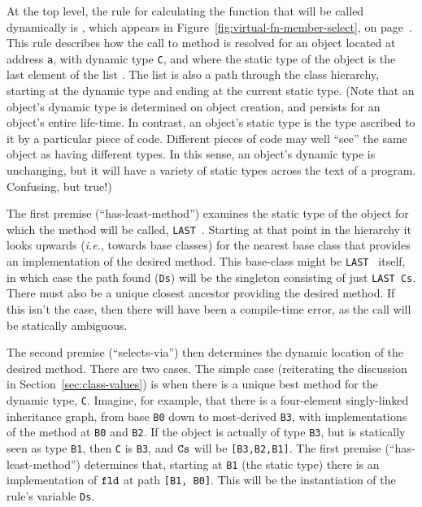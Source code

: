 \documentclass[11pt]{article}
\newcommand{\ie}{\emph{i.e.}}
\begin{document}
At the top level, the rule for calculating the function that will be
called dynamically is , which appears
in Figure~\ref{fig:virtual-fn-member-select}, on
page~\pageref{fig:virtual-fn-member-select}.  This rule describes how
the call to method \fld{} is resolved for an object located at address
\texttt{a}, with dynamic type \texttt{C}, and where the static type of
the object is the last element of the list \Cs.  The list \Cs{} is
also a path through the class hierarchy, starting at the dynamic type
and ending at the current static type.  (Note that an object's dynamic
type is determined on object creation, and persists for an object's
entire life-time.  In contrast, an object's static type is the type
ascribed to it by a particular piece of code.  Different pieces of
code may well ``see'' the same object as having different types.  In
this sense, an object's dynamic type is unchanging, but it will have a
variety of static types across the text of a program.  Confusing, but
true!)

The first premise (``has-least-method'') examines the static type of
the object for which the method will be called, \texttt{LAST~\Cs}.
Starting at that point in the hierarchy it looks upwards (\ie, towards
base classes) for the nearest base class that provides an
implementation of the desired method.  This base-class might be
\texttt{LAST~\Cs} itself, in which case the path found (\texttt{Ds})
will be the singleton consisting of just \texttt{LAST~Cs}.  There must
also be a unique closest ancestor providing the desired method.  If
this isn't the case, then there will have been a compile-time error,
as the call will be statically ambiguous.

The second premise (``selects-via'') then determines the dynamic
location of the desired method.  There are two cases.  The simple case
(reiterating the discussion in Section~\ref{sec:class-values}) is when
there is a unique best method for the dynamic type, \texttt{C}.
Imagine, for example, that there is a four-element singly-linked
inheritance graph, from base \texttt{B0} down to most-derived
\texttt{B3}, with implementations of the method \fld{} at \texttt{B0}
and \texttt{B2}.  If the object is actually of type \texttt{B3}, but
is statically seen as type \texttt{B1}, then \texttt{C} is
\texttt{B3}, and $\texttt{Cs}$ will be \texttt{[B3,B2,B1]}.  The first premise
(``has-least-method'') determines that, starting at \texttt{B1} (the
static type) there is an implementation of $\texttt{fld}$ at path \texttt{[B1,
  B0]}.  This will be the instantiation of the rule's variable
\texttt{Ds}.
\end{document}
